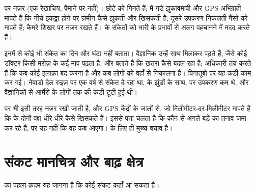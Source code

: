\begin{omfigure}
{\small {} पर नज़र (एक रेखाचित्र, पैमाने पर नहीं)।  छोटे  को
गिनते हैं;  में गड़े झुकावमापी और GPS अभिग्राही मापते हैं कि नीचे  इकट्ठा
होने पर ज़मीन कैसे झुकती और खिसकती है; दूसरे उपकरण निकलती गैसों को मापते हैं; कैमरे शिखर
पर नज़र रखते हैं।   के संकेतों को भारी  के प्रभावों से अलग पहचानने
में मदद करते
हैं।}
\label{fig:g9:natural-risks:monitoring}
\end{omfigure}

इनमें से कोई भी संकेत  का दिन और घंटा नहीं बताता। वैज्ञानिक उन्हें साथ मिलाकर पढ़ते
हैं, जैसे कोई डॉक्टर किसी मरीज़ के कई माप पढ़ता है, और बताते हैं कि ख़तरा कैसे बदल रहा
है; अधिकारी तय करते हैं कि कब कोई इलाक़ा बंद करना है और कब लोगों को वहाँ से निकालना है।
पिनातूबो पर यह कड़ी काम कर गई। नेवाडो देल रुइज़ पर  एक वर्ष से संकेत दे रहा
था,  के झुंडों के साथ, पर उपकरण कम थे, और वैज्ञानिकों से आर्मेरो के लोगों तक की
कड़ी टूटी हुई
थी।

 पर भी इसी तरह नज़र रखी जाती है,  और GPS केंद्रों के जालों से, जो
मिलीमीटर-दर-मिलीमीटर मापते हैं कि  के दोनों पक्ष धीरे-धीरे कैसे खिसकते हैं। इससे पता
चलता है कि कौन-से  अगले बड़े  का तनाव जमा कर रहे हैं, पर यह नहीं कि वह कब आएगा।
 के लिए  ही मुख्य बचाव
है।

\section{संकट मानचित्र और बाढ़ क्षेत्र}

 का पहला क़दम यह जानना है कि कोई संकट कहाँ आ सकता है।

